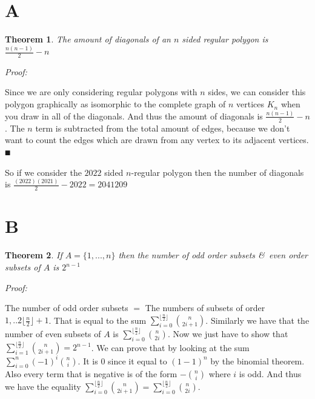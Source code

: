 \documentclass[paper=a4,fontsize=paper,12.5pt]{book}
\newcommand{\3}{\vspace*{3mm}}
\newcommand{\Proof}{\textit{Proof:}}
\newcommand*{\comb}[2]{\binom{#1}{#2}}
\begin{document}
\newtheorem{lemma}{Lemma}
\newtheorem{sublemma}{Lemma}[lemma]
\newtheorem{theorem}{Theorem}
\newtheorem{conjecture}{Conjecture}

\newtheorem{definition}{Definition}[section]
\newtheorem{problem}{Problem}
\newtheorem{corollary}{Corollary}


\section*{A}

\3

\begin{theorem}

The amount of diagonals of an $n$ sided regular polygon is $\frac{n(n-1)}{2} - {n}$


\end{theorem}

\3

\Proof

\3

Since we are only considering regular polygons with $n$ sides, we can consider this polygon graphically as isomorphic to the complete graph of $n$ vertices ${K}_{n}$ when you draw in all of the diagonals. And thus the amount of diagonals is $\frac{n(n-1)}{2} - n$. The $n$ term is subtracted from the total amount of edges, because we don't want to count the edges which are drawn from any vertex to its adjacent vertices. $\QED$

\3

So if we consider the $2022$ sided $n$-regular polygon then the number of diagonals is $\frac{(2022)(2021)}{2} - 2022 = 2041209$

\3

\section*{B}

\3

\begin{theorem}

If $A = \{1, ..., n\}$ then the number of odd order subsets \&\ even order subsets of $A$ is ${2}^{n-1}$

\end{theorem}

\Proof

\3

The number of odd order subsets $=$ The numbers of subsets of order $1, .. 2\lfloor \frac{n}{2} \rfloor + 1$. That is equal to the sum $\sum_{i = 0}^{\lfloor \frac{n}{2} \rfloor}\comb{n}{2i+1}$. Similarly we have that the number of even subsets of $A$ is $\sum_{i = 0}^{\lfloor \frac{n}{2} \rfloor}\comb{n}{2i}$. Now we just have to show that $\sum_{i = 1}^{\lfloor \frac{n}{2} \rfloor}\comb{n}{2i+1} = {2}^{n-1}$. We can prove that by looking at the sum $\sum_{i =0 }^{n} {(-1)}^{i}\comb{n}{i} $. It is $0$ since it equal to ${(1-1)}^{n}$ by the binomial theorem. Also every term that is negative is of the form $-\comb{n}{i}$ where $i$ is odd. And thus we have the equality $\sum_{i = 0}^{\lfloor \frac{n}{2} \rfloor}\comb{n}{2i+1} = \sum_{i = 0}^{\lfloor \frac{n}{2} \rfloor}\comb{n}{2i}$. 
\end{document}
